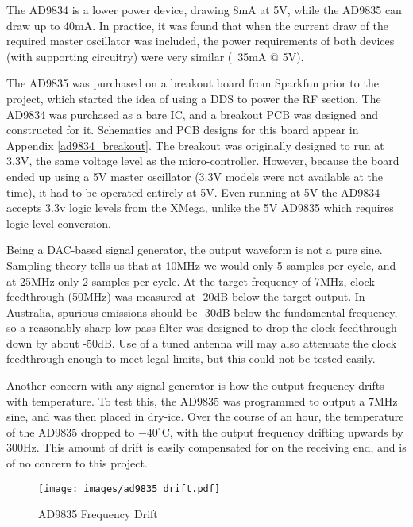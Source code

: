 \documentclass[a4paper,12pt]{article}
\begin{document}
The AD9834 is a lower power device, drawing 8mA at 5V, while the AD9835 can draw up to 40mA. In practice, it was found that when the current draw of the required master oscillator was included, the power requirements of both devices (with supporting circuitry) were very similar (~35mA @ 5V).

The AD9835 was purchased on a breakout board from Sparkfun prior to the project, which started the idea of using a DDS to power the RF section. The AD9834 was purchased as a bare IC, and a breakout PCB was designed and constructed for it. Schematics and PCB designs for this board appear in Appendix \ref{ad9834_breakout}. The breakout was originally designed to run at 3.3V, the same voltage level as the micro-controller. However, because the board ended up using a 5V master oscillator (3.3V models were not available at the time), it had to be operated entirely at 5V. Even running at 5V the AD9834 accepts 3.3v logic levels from the XMega, unlike the 5V AD9835 which requires logic level conversion.

Being a DAC-based signal generator, the output waveform is not a pure sine. Sampling theory tells us that at 10MHz we would only 5 samples per cycle, and at 25MHz only 2 samples per cycle. At the target frequency of 7MHz, clock feedthrough (50MHz) was measured at -20dB below the target output. In Australia, spurious emissions should be -30dB below the fundamental frequency, so a reasonably sharp low-pass filter was designed to drop the clock feedthrough down by about -50dB. Use of a tuned antenna will may also attenuate the clock feedthrough enough to meet legal limits, but this could not be tested easily.

Another concern with any signal generator is how the output frequency drifts with temperature. To test this, the AD9835 was programmed to output a 7MHz sine, and was then placed in dry-ice. Over the course of an hour, the temperature of the AD9835 dropped to $-40^\circ$C, with the output frequency drifting upwards by 300Hz. This amount of drift is easily compensated for on the receiving end, and is of no concern to this project.

\begin{figure}[h]
  \begin{center}
    \texttt{[image: images/ad9835\_drift.pdf]}
  \end{center}
  \caption{AD9835 Frequency Drift}
  \label{fig:ad9835_drift}
\end{figure}
\end{document}
